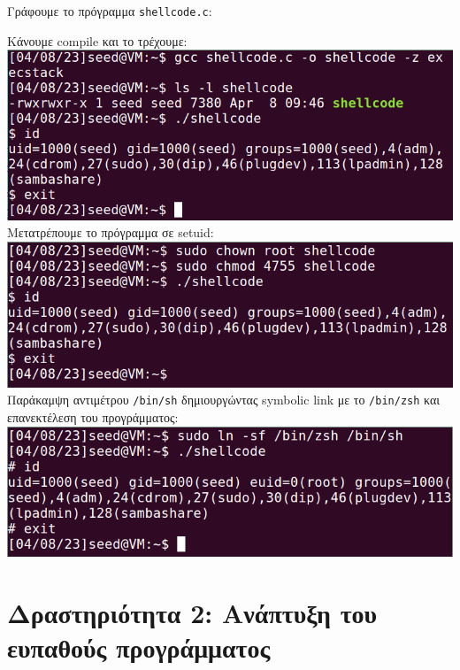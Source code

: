 \documentclass[12pt]{article}
\begin{document}
Γράφουμε το πρόγραμμα \lstinline{shellcode.c}:



Κάνουμε compile και το τρέχουμε: \\

\includegraphics[width=\textwidth]{res/shellcode.png} \\

Μετατρέπουμε το πρόγραμμα σε setuid: \\

\includegraphics[width=\textwidth]{res/chownshellcode.png} \\

Παράκαμψη αντιμέτρου \lstinline{/bin/sh} δημιουργώντας symbolic link με το
\lstinline{/bin/zsh} και επανεκτέλεση του προγράμματος: \\

\includegraphics[width=\textwidth]{res/zshshellcode.png} \\

\section{Δραστηριότητα 2: Ανάπτυξη του ευπαθούς προγράμματος}
\end{document}
